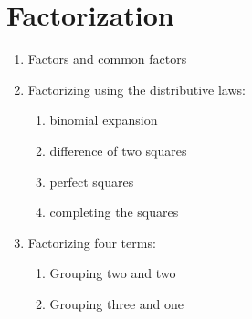 
\chapter{Factorization}

\begin{enumerate}
\item Factors and common factors

\item Factorizing using the distributive laws:
  \begin{enumerate}
  \item binomial expansion

  \item difference of two squares

  \item perfect squares

  \item completing the squares
  \end{enumerate}

\item Factorizing four terms:
  \begin{enumerate}
  \item Grouping two and two

  \item Grouping three and one
  \end{enumerate}
\end{enumerate}
